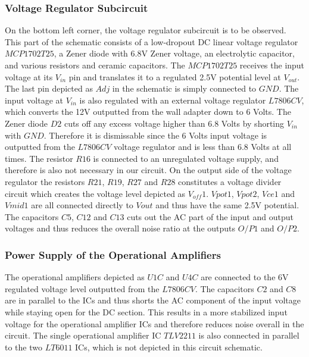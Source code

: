 \subsubsection{Voltage Regulator Subcircuit}
On the bottom left corner, the voltage regulator subcircuit is to be observed. This part of the schematic consists of a low-dropout DC linear voltage regulator $MCP1702T25$, a Zener diode with 6.8V Zener voltage, an electrolytic capacitor, and various resistors and ceramic capacitors. The $MCP1702T25$ receives the input voltage at its $V_{in}$ pin and translates it to a regulated 2.5V potential level at $V_{out}$. The last pin depicted as $Adj$ in the schematic is simply connected to $GND$. The input voltage at $V_{in}$ is also regulated with an external voltage regulator $L7806CV$, which converts the 12V outputted from the wall adapter down to 6 Volts. The Zener diode $D2$ cuts off any excess voltage higher than 6.8 Volts by shorting $V_{in}$ with $GND$. Therefore it is dismissable since the 6 Volts input voltage is outputted from the $L7806CV$ voltage regulator and is less than 6.8 Volts at all times. The resistor $R16$ is connected to an unregulated voltage supply, and therefore is also not necessary in our circuit. On the output side of the voltage regulator the resistors $R21$, $R19$, $R27$ and $R28$ constitutes a voltage divider circuit which creates the voltage level depicted as $V_{off}1$. $V{pot}1$, $V{pot}2$, $V{ce}1$ and $V{mid}1$ are all connected directly to $V{out}$ and thus have the same 2.5V potential. The capacitors $C5$, $C12$ and $C13$ cuts out the AC part of the input and output voltages and thus reduces the overall noise ratio at the outputs $O/P1$ and $O/P2$.

\subsubsection{Power Supply of the Operational Amplifiers}

The operational amplifiers depicted as $U1C$ and $U4C$ are connected to the 6V regulated voltage level outputted from the $L7806CV$. The capacitors $C2$ and $C8$ are in parallel to the ICs and thus shorts the AC component of the input voltage while staying open for the DC section. This results in a more stabilized input voltage for the operational amplifier ICs and therefore reduces noise overall in the circuit. The single operational amplifier IC $TLV2211$ is also connected in parallel to the two $LT6011$ ICs, which is not depicted in this circuit schematic.


